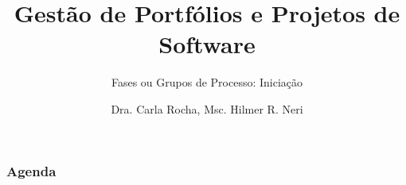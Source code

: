 \documentclass[12pt]{beamer}
\title{Gestão de Portfólios e Projetos de Software}
\subtitle{Fases ou Grupos de Processo: Iniciação}
\author{Dra. Carla Rocha, Msc. Hilmer R. Neri}
\institute{Engenharia de Software \\ Universidade de Brasília}
\date{}
\begin{document}
\frame{\titlepage \vspace{-0.5cm}	
}
\frame
{
\frametitle{Agenda}
\tableofcontents%
}

\end{document}
